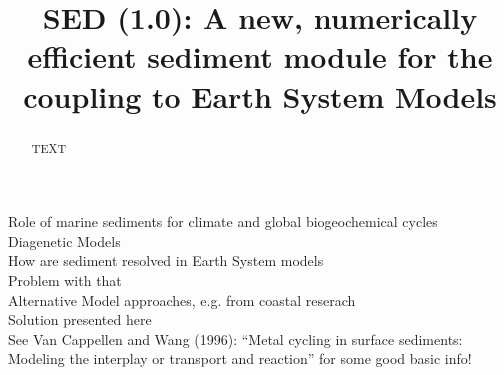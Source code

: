 \documentclass[gmd, manuscript]{copernicus}
\begin{document}

\title{SED (1.0): A new, numerically efficient sediment module for the coupling to Earth System Models}












\received{}
\pubdiscuss{} %
\revised{}
\accepted{}
\published{}




\maketitle



\begin{abstract}
TEXT
\end{abstract}



\introduction  %
Role of marine sediments for climate and global biogeochemical cycles\\
Diagenetic Models\\
How are sediment resolved in Earth System models\\
Problem with that\\
Alternative Model approaches, e.g. from coastal reserach\\
Solution presented here\\ 
See Van Cappellen and Wang (1996): ``Metal cycling in surface sediments: Modeling the interplay or transport and reaction'' for some good basic info! 
\end{document}
